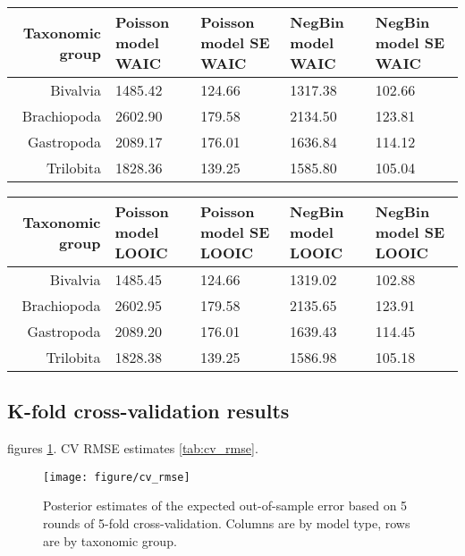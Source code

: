 \documentclass[12pt,letterpaper]{article}
\begin{document}
\begin{sidewaystable}
  \centering
  \caption{}
  \label{tab:waic}
  \begin{tabular}{r|llll}
    \hline
    Taxonomic group & Poisson model WAIC & Poisson model SE WAIC & NegBin model WAIC & NegBin model SE WAIC \\ 
    \hline
    Bivalvia & 1485.42 & 124.66 & 1317.38 & 102.66 \\ 
    Brachiopoda & 2602.90 & 179.58 & 2134.50 & 123.81 \\ 
    Gastropoda & 2089.17 & 176.01 & 1636.84 & 114.12 \\ 
    Trilobita & 1828.36 & 139.25 & 1585.80 & 105.04 \\ 
    \hline
  \end{tabular}
\end{sidewaystable}

\begin{sidewaystable}
  \centering
  \caption{}
  \label{tab:loo}
  \begin{tabular}{r|llll}
    \hline
    Taxonomic group & Poisson model LOOIC & Poisson model SE LOOIC & NegBin model LOOIC & NegBin model SE LOOIC \\ 
    \hline
    Bivalvia & 1485.45 & 124.66 & 1319.02 & 102.88 \\ 
    Brachiopoda & 2602.95 & 179.58 & 2135.65 & 123.91 \\ 
    Gastropoda & 2089.20 & 176.01 & 1639.43 & 114.45 \\ 
    Trilobita & 1828.38 & 139.25 & 1586.98 & 105.18 \\ 
    \hline
  \end{tabular}
\end{sidewaystable}



\subsection{K-fold cross-validation results}
figures \ref{fig:cv_rmse}. CV RMSE estimates \ref{tab:cv_rmse}.

\afterpage{\clearpage}
\begin{figure}[h]
  \centering
  \texttt{[image: figure/cv\_rmse]}
  \caption{Posterior estimates of the expected out-of-sample error based on 5 rounds of 5-fold cross-validation. Columns are by model type, rows are by taxonomic group.}
  \label{fig:cv_rmse}
\end{figure}
\end{document}
